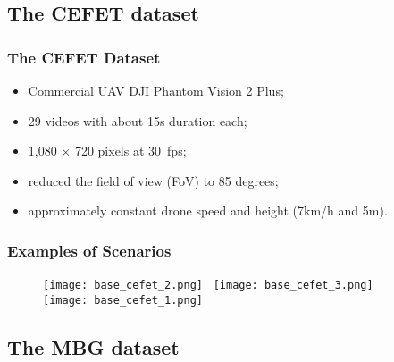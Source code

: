 \documentclass{beamer}
\begin{document}
	\subsection{The CEFET dataset}

	\begin{frame}\frametitle{The CEFET Dataset}
		\begin{itemize}
			\item Commercial UAV DJI Phantom Vision 2 Plus;
			\item 29 videos with about 15s duration each;
			\item 1,080 $\times$ 720 pixels at $30$~fps;
			\item reduced the field of view (FoV) to 85 degrees;
			\item approximately constant drone speed and height (7km/h and 5m).
		\end{itemize}
	\end{frame}


	\begin{frame}\frametitle{Examples of Scenarios}
		\begin{figure}[htb!]
			\centering
			\texttt{[image: base\_cefet\_2.png]}~
			\texttt{[image: base\_cefet\_3.png]}\\
			\vspace{.5mm}
			\texttt{[image: base\_cefet\_1.png]}
			\label{fig:base_cefet}
		\end{figure}
	\end{frame}



	\subsection{The MBG dataset}
\end{document}
